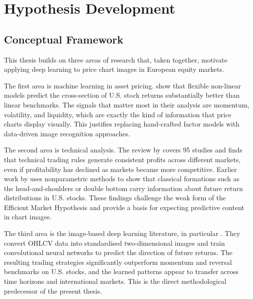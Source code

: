 
\newpage
\section{Hypothesis Development}

\subsection{Conceptual Framework}

This thesis builds on three areas of research that, taken together, motivate applying deep learning to price chart images in European equity markets.

The first area is machine learning in asset pricing. \textcite{Gu2020} show that flexible non-linear models predict the cross-section of U.S. stock returns substantially better than linear benchmarks. The signals that matter most in their analysis are momentum, volatility, and liquidity, which are exactly the kind of information that price charts display visually. This justifies replacing hand-crafted factor models with data-driven image recognition approaches.

The second area is technical analysis. The review by \textcite{Park2007} covers 95 studies and finds that technical trading rules generate consistent profits across different markets, even if profitability has declined as markets became more competitive. Earlier work by \textcite{lo2000} uses nonparametric methods to show that classical formations such as the head-and-shoulders or double bottom carry information about future return distributions in U.S. stocks. These findings challenge the weak form of the Efficient Market Hypothesis \parencite{fama1970} and provide a basis for expecting predictive content in chart images.

The third area is the image-based deep learning literature, in particular \textcite{Jiang2023}. They convert OHLCV data into standardised two-dimensional images and train convolutional neural networks to predict the direction of future returns. The resulting trading strategies significantly outperform momentum and reversal benchmarks on U.S. stocks, and the learned patterns appear to transfer across time horizons and international markets. This is the direct methodological predecessor of the present thesis.

